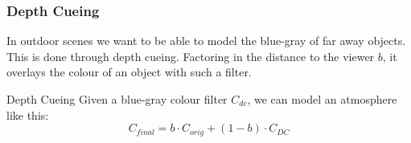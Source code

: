 \documentclass[english]{panikzettel}
\begin{document}
\begin{halfboxl}
\vspace{-\baselineskip}
\subsubsection*{Depth Cueing}

In outdoor scenes we want to be able to model the blue-gray of far away objects. This is done through depth cueing. Factoring in the distance to the viewer $b$, it overlays the colour of an object with such a filter.
\end{halfboxl}%
\begin{halfboxr}
\vspace{-\baselineskip}
\begin{defi}{Depth Cueing}
Given a blue-gray colour filter $C_{dc}$, we can model an atmosphere like this:
$$C_{final} = b \cdot C_{orig} + (1-b) \cdot C_{DC}$$
\end{defi}
\end{halfboxr}
\end{document}
